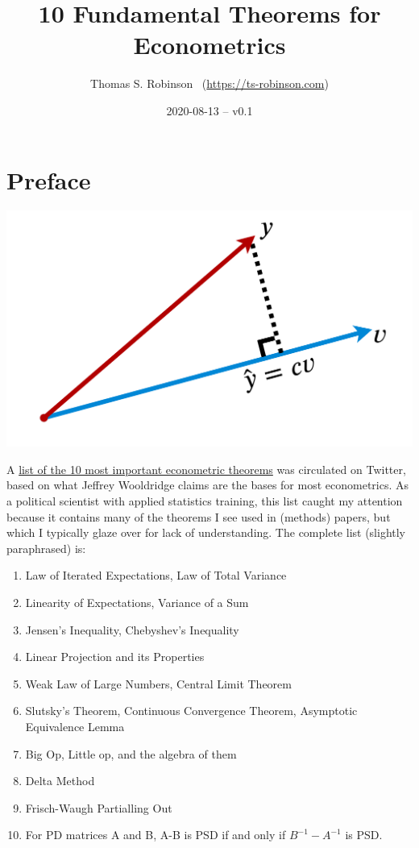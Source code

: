 \documentclass[
]{book}
\title{10 Fundamental Theorems for Econometrics}
\author{Thomas S. Robinson ~(\url{https://ts-robinson.com})}
\date{2020-08-13 -- v0.1}
\providecommand{\tightlist}{%
  \setlength{\itemsep}{0pt}\setlength{\parskip}{0pt}}
\begin{document}
\maketitle

\hypertarget{intro}{%
\chapter*{Preface}\label{intro}}

\includegraphics[width=1\linewidth]{images/slider_bg2}

A \href{https://twitter.com/causalinf/status/1259448663270658050}{list of the 10 most important econometric theorems} was circulated on Twitter, based on what Jeffrey Wooldridge claims are the bases for most econometrics. As a political scientist with applied statistics training, this list caught my attention because it contains many of the theorems I see used in (methods) papers, but which I typically glaze over for lack of understanding. The complete list (slightly paraphrased) is:

\begin{enumerate}
\def\labelenumi{\arabic{enumi}.}
\tightlist
\item
  Law of Iterated Expectations, Law of Total Variance
\item
  Linearity of Expectations, Variance of a Sum
\item
  Jensen's Inequality, Chebyshev's Inequality
\item
  Linear Projection and its Properties
\item
  Weak Law of Large Numbers, Central Limit Theorem
\item
  Slutsky's Theorem, Continuous Convergence Theorem, Asymptotic Equivalence Lemma
\item
  Big Op, Little op, and the algebra of them
\item
  Delta Method
\item
  Frisch-Waugh Partialling Out
\item
  For PD matrices A and B, A-B is PSD if and only if \(B^{-1} - A^{-1}\) is PSD.
\end{enumerate}
\end{document}
